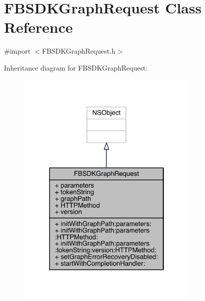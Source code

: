 \hypertarget{interface_f_b_s_d_k_graph_request}{\section{F\-B\-S\-D\-K\-Graph\-Request Class Reference}
\label{interface_f_b_s_d_k_graph_request}
}


{\ttfamily \#import $<$F\-B\-S\-D\-K\-Graph\-Request.\-h$>$}



Inheritance diagram for F\-B\-S\-D\-K\-Graph\-Request\-:
\nopagebreak
\begin{figure}[H]
\begin{center}
\leavevmode
\includegraphics[width=250pt]{interface_f_b_s_d_k_graph_request__inherit__graph}
\end{center}
\end{figure}


